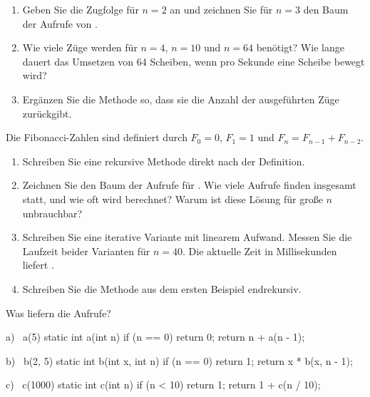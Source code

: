 \begin{enumerate}[label=\alph*)]
\item Geben Sie die Zugfolge für $n = 2$ an und zeichnen Sie für $n = 3$ den Baum der Aufrufe von .
\item Wie viele Züge werden für $n = 4$, $n = 10$ und $n = 64$ benötigt? Wie lange dauert das Umsetzen von 64 Scheiben, wenn pro Sekunde eine Scheibe bewegt wird?
\item Ergänzen Sie die Methode so, dass sie die Anzahl der ausgeführten Züge zurückgibt.
\end{enumerate}

Die Fibonacci-Zahlen sind definiert durch $F_0 = 0$, $F_1 = 1$ und $F_n = F_{n-1} + F_{n-2}$.
\begin{enumerate}[label=\alph*)]
\item Schreiben Sie eine rekursive Methode  direkt nach der Definition.
\item Zeichnen Sie den Baum der Aufrufe für . Wie viele Aufrufe finden insgesamt statt, und wie oft wird  berechnet? Warum ist diese Lösung für große $n$ unbrauchbar?
\item Schreiben Sie eine iterative Variante mit linearem Aufwand. Messen Sie die Laufzeit beider Varianten für $n = 40$. Die aktuelle Zeit in Millisekunden liefert .
\item Schreiben Sie die Methode  aus dem ersten Beispiel endrekursiv.
\end{enumerate}

\ueben
{}
Was liefern die Aufrufe?
\begin{tcbraster}[raster columns=3, raster equal height=rows, raster column skip=3mm]
\begin{javacode}[Ausschnitt]{a) \ a(5)}
static int a(int n) {
	if (n == 0) return 0;
	return n + a(n - 1);
}
\end{javacode}
\begin{javacode}[Ausschnitt]{b) \ b(2, 5)}
static int b(int x, int n) {
	if (n == 0) return 1;
	return x * b(x, n - 1);
}
\end{javacode}
\begin{javacode}[Ausschnitt]{c) \ c(1000)}
static int c(int n) {
	if (n < 10) return 1;
	return 1 + c(n / 10);
}
\end{javacode}
\end{tcbraster}


